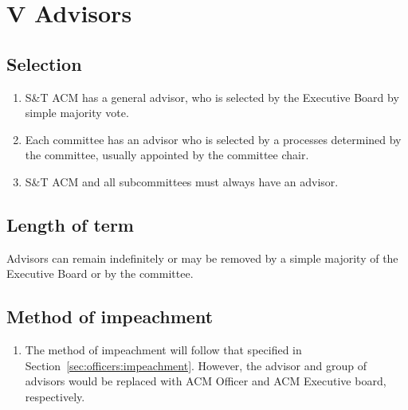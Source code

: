 \section{V \textendash{} Advisors}
\subsection{Selection}
\begin{enumerate}
  \item S\&T ACM has a general advisor, who is selected by the Executive Board
    by simple majority vote.
  \item Each committee has an advisor who is selected by a processes determined
    by the committee, usually appointed by the committee chair.
  \item S\&T ACM and all subcommittees must always have an advisor.
\end{enumerate}

\subsection{Length of term}
Advisors can remain indefinitely or may be removed by a simple majority of
the Executive Board or by the committee.

\subsection{Method of impeachment}
\begin{enumerate}[label=\arabic*.]
  \item The method of impeachment will follow that specified in
    Section~\ref{sec:officers:impeachment}.  However, the advisor and group of
    advisors would be replaced with ACM Officer and ACM Executive board,
    respectively.
\end{enumerate}
